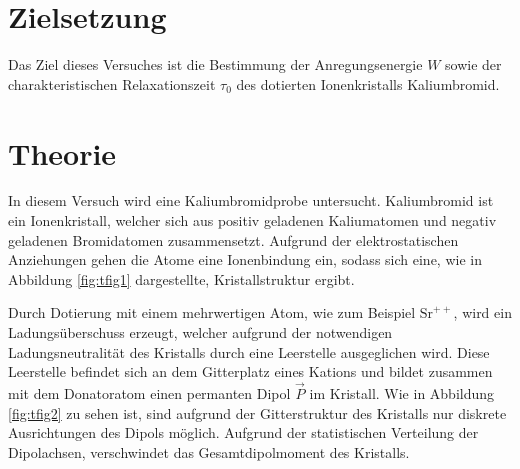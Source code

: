\section{Zielsetzung}
Das Ziel dieses Versuches ist die Bestimmung der Anregungsenergie $W$ sowie der charakteristischen Relaxationszeit $\tau_0$ des dotierten Ionenkristalls Kaliumbromid.

\section{Theorie}
In diesem Versuch wird eine Kaliumbromidprobe untersucht.
Kaliumbromid ist ein Ionenkristall, welcher sich aus positiv geladenen Kaliumatomen und negativ geladenen Bromidatomen zusammensetzt.
Aufgrund der elektrostatischen Anziehungen gehen die Atome eine Ionenbindung ein, sodass sich eine, wie in Abbildung \ref{fig:tfig1} dargestellte, Kristallstruktur ergibt.

Durch Dotierung mit einem mehrwertigen Atom, wie zum Beispiel $\text{Sr}^{++}$, wird ein Ladungsüberschuss erzeugt, welcher aufgrund der notwendigen Ladungsneutralität des Kristalls durch eine Leerstelle ausgeglichen wird.
Diese Leerstelle befindet sich an dem Gitterplatz eines Kations und bildet zusammen mit dem Donatoratom einen permanten Dipol $\vec{P}$ im Kristall.
Wie in Abbildung \ref{fig:tfig2} zu sehen ist, sind aufgrund der Gitterstruktur des Kristalls nur diskrete Ausrichtungen des Dipols möglich.
Aufgrund der statistischen Verteilung der Dipolachsen, verschwindet das Gesamtdipolmoment des Kristalls.

